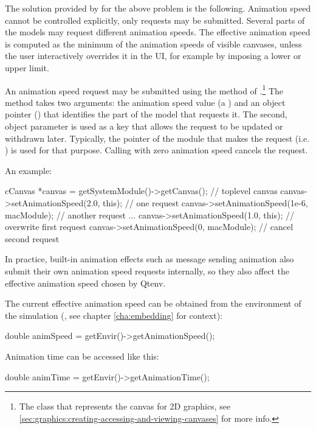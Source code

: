 The solution provided by {\opp} for the above problem is the following.
Animation speed cannot be controlled explicitly, only requests may be submitted.
Several parts of the models may request different animation speeds.
The effective animation speed is computed as the minimum of the animation
speeds of visible canvases, unless the user interactively overrides it in the UI,
for example by imposing a lower or upper limit.

An animation speed request may be submitted using the 
method of .\footnote{The class that represents the canvas for
2D graphics, see \ref{sec:graphics:creating-accessing-and-viewing-canvases} for more
info.} The  method takes two arguments:
the animation speed value (a ) and an object pointer ()
that identifies the part of the model that requests it. The second, object parameter
is used as a key that allows the request to be updated or withdrawn later.
Typically, the pointer of the module that makes the request (i.e. ) is
used for that purpose. Calling  with zero animation
speed cancels the request.

An example:

\begin{cpp}
cCanvas *canvas = getSystemModule()->getCanvas(); // toplevel canvas
canvas->setAnimationSpeed(2.0, this); // one request
canvas->setAnimationSpeed(1e-6, macModule); // another request
...
canvas->setAnimationSpeed(1.0, this); // overwrite first request
canvas->setAnimationSpeed(0, macModule); // cancel second request
\end{cpp}

In practice, built-in animation effects such as message sending animation
also submit their own animation speed requests internally, so they also
affect the effective animation speed chosen by Qtenv.

The current effective animation speed can be obtained from the environment of the
simulation (, see chapter \ref{cha:embedding} for context):

\begin{cpp}
double animSpeed = getEnvir()->getAnimationSpeed();
\end{cpp}

Animation time can be accessed like this:

\begin{cpp}
double animTime = getEnvir()->getAnimationTime();
\end{cpp}

